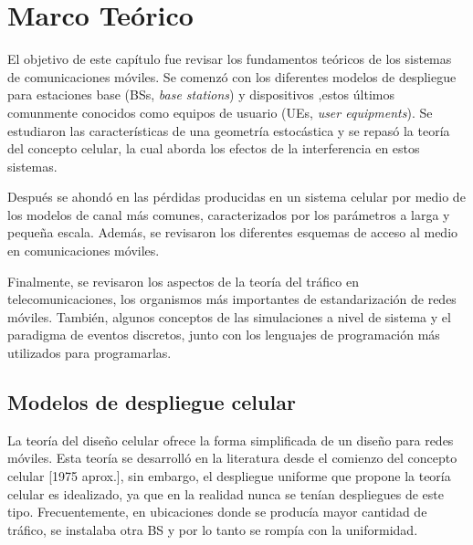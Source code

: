 
\chapter{Marco Teórico} %

\label{Chapter2} 

El objetivo de este capítulo fue revisar los fundamentos teóricos de los sistemas de comunicaciones móviles. Se comenzó con los diferentes modelos de despliegue para estaciones base (BSs, \textit{base stations}) y dispositivos ,estos últimos comunmente conocidos como equipos de usuario (UEs, \textit{user equipments}). Se estudiaron las características de una geometría estocástica y se repasó la teoría del concepto celular, la cual aborda los efectos de la interferencia en estos sistemas.\newline

Después se ahondó en las pérdidas producidas en un sistema celular por medio de los modelos de canal más comunes, caracterizados por los parámetros a larga y pequeña escala. Además, se revisaron los diferentes esquemas de acceso al medio en comunicaciones móviles.\newline

Finalmente, se revisaron los aspectos de la teoría del tráfico en telecomunicaciones, los organismos más importantes de estandarización de redes móviles. También, algunos conceptos de las simulaciones a nivel de sistema y el paradigma de eventos discretos, junto con los lenguajes de programación más utilizados para programarlas.\newline



\section{Modelos de despliegue celular}

La teoría del diseño celular ofrece la forma simplificada de un diseño para redes móviles. Esta teoría se desarrolló en la literatura desde el comienzo del concepto celular [1975 aprox.], sin embargo, el despliegue uniforme que propone la teoría celular es idealizado, ya que en la realidad nunca se tenían despliegues de este tipo. Frecuentemente, en ubicaciones donde se producía mayor cantidad de tráfico, se instalaba otra BS y por lo tanto se rompía con la uniformidad.\newline


